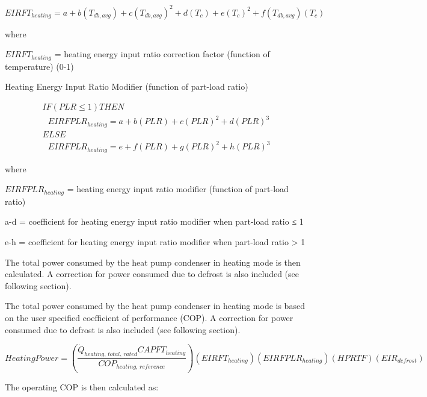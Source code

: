 \begin{equation}
  EIRFT_{heating} = a + b \left( T_{db,avg} \right) + c \left( T_{db,avg} \right)^2 + d \left( T_c \right) + e \left( T_c \right)^2 + f \left( T_{db,avg} \right) \left( T_c \right)
\end{equation}

where

\(EIRFT_{heating}\) = heating energy input ratio correction factor (function of temperature) (0-1)

Heating Energy Input Ratio Modifier (function of part-load ratio)

\begin{equation}
  \begin{array}{l}
    IF \left( PLR \le 1 \right) THEN \\
    \,\,\,\,EIRFPLR_{heating} = a + b \left( PLR \right) + c \left( PLR \right)^2 + d \left( PLR \right)^3 \\
    ELSE \\
    \,\,\,\,EIRFPLR_{heating} = e + f \left( PLR \right) + g \left( PLR \right)^2 + h \left( PLR \right)^3
  \end{array}
\end{equation}

where

\(EIRFPLR_{heating}\) = heating energy input ratio modifier (function of part-load ratio)

a-d = coefficient for heating energy input ratio modifier when part-load ratio ≤ 1

e-h = coefficient for heating energy input ratio modifier when part-load ratio > 1

The total power consumed by the heat pump condenser in heating mode is then calculated. A correction for power consumed due to defrost is also included (see following section).

The total power consumed by the heat pump condenser in heating mode is based on the user specified coefficient of performance (COP). A correction for power consumed due to defrost is also included (see following section).

\begin{equation}
  HeatingPower = \left( \frac{\dot{Q}_{heating,\,total,\,rated} CAPFT_{heating}}{COP_{heating,\,reference}} \right) \left( EIRFT_{heating} \right) \left( EIRFPLR_{heating} \right) \left( HPRTF \right) \left( EIR_{defrost} \right)
\end{equation}

The operating COP is then calculated as:

